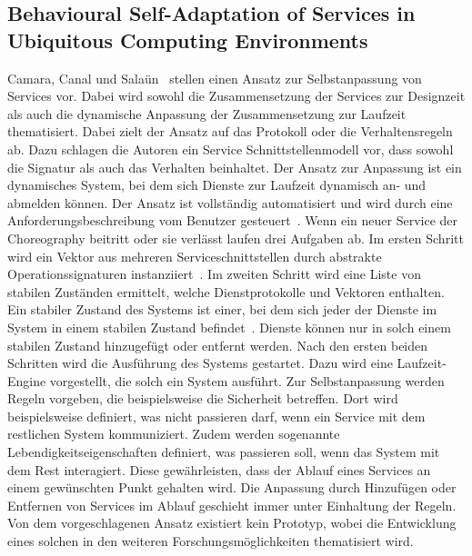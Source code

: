 \documentclass[conference,compsoc]{IEEEtran}
\begin{document}
\subsection{Behavioural Self-Adaptation of Services in Ubiquitous Computing Environments}
Camara, Canal und Salaün~\cite{camara2009behavioural} stellen einen Ansatz zur Selbstanpassung von Services vor. Dabei wird sowohl die Zusammensetzung der Services zur Designzeit als auch die dynamische Anpassung der Zusammensetzung zur Laufzeit thematisiert.
Dabei zielt der Ansatz auf das Protokoll oder die Verhaltensregeln ab. Dazu schlagen die Autoren ein Service Schnittstellenmodell vor, dass sowohl die Signatur als auch das Verhalten beinhaltet.
Der Ansatz zur Anpassung ist ein dynamisches System, bei dem sich Dienste zur Laufzeit dynamisch an- und abmelden können. Der Ansatz ist vollständig automatisiert und wird durch eine Anforderungsbeschreibung vom Benutzer gesteuert~\cite{camara2009behavioural}. Wenn ein neuer Service der Choreography beitritt oder sie verlässt laufen drei Aufgaben ab. Im ersten Schritt wird ein Vektor aus mehreren Serviceschnittstellen durch abstrakte Operationssignaturen instanziiert~\cite{camara2009behavioural}. Im zweiten Schritt wird eine Liste von stabilen Zuständen ermittelt, welche Dienstprotokolle und Vektoren enthalten. Ein stabiler Zustand des Systems ist einer, bei dem sich jeder der Dienste im System in einem stabilen Zustand befindet~\cite{camara2009behavioural}. Dienste können nur in solch einem stabilen Zustand hinzugefügt oder entfernt werden. Nach den ersten beiden Schritten wird die Ausführung des Systems gestartet. Dazu wird eine Laufzeit-Engine vorgestellt, die solch ein System ausführt.
Zur Selbstanpassung werden Regeln vorgeben, die beispielsweise die Sicherheit betreffen. Dort wird beispielsweise definiert, was nicht passieren darf, wenn ein Service mit dem restlichen System kommuniziert.
Zudem werden sogenannte Lebendigkeitseigenschaften definiert, was passieren soll, wenn das System mit dem Rest interagiert. Diese gewährleisten, dass der Ablauf eines Services an einem gewünschten Punkt gehalten wird. Die Anpassung durch Hinzufügen oder Entfernen von Services im Ablauf geschieht immer unter Einhaltung der Regeln.
Von dem vorgeschlagenen Ansatz existiert kein Prototyp, wobei die Entwicklung eines solchen in den weiteren Forschungsmöglichkeiten thematisiert wird.
\end{document}
